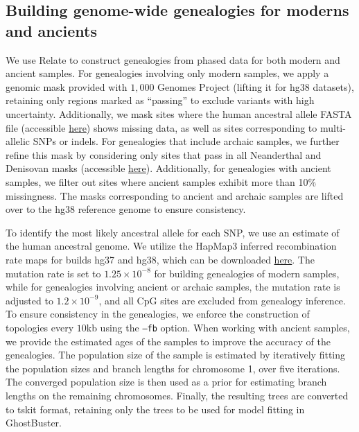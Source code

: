 \subsection{Building genome-wide genealogies for moderns and ancients}

We use Relate \cite{speidel2019method} to construct genealogies from phased data for both modern and ancient samples. For genealogies involving only modern samples, we apply a genomic mask provided with $1{,}000$ Genomes Project (lifting it for hg38 datasets), retaining only regions marked as ``passing'' to exclude variants with high uncertainty. Additionally, we mask sites where the human ancestral allele FASTA file (accessible \href{ftp://ftp.ensembl.org/pub/release-74/fasta/ancestral_alleles/homo_sapiens_ancestor_GRCh37_e71.tar.bz2}{here}) shows missing data, as well as sites corresponding to multi-allelic SNPs or indels. For genealogies that include archaic samples, we further refine this mask by considering only sites that pass in all Neanderthal and Denisovan masks (accessible \href{http://ftp.eva.mpg.de/neandertal/}{here}). Additionally, for genealogies with ancient samples, we filter out sites where ancient samples exhibit more than 10\% missingness. The masks corresponding to ancient and archaic samples are lifted over to the hg38 reference genome to ensure consistency.

To identify the most likely ancestral allele for each SNP, we use an estimate of the human ancestral genome. We utilize the HapMap3 inferred recombination rate maps for builds hg37 and hg38, which can be downloaded \href{https://github.com/odelaneau/shapeit5/tree/main/resources/maps/}{here}. The mutation rate is set to $1.25 \times 10^{-8}$ for building genealogies of modern samples, while for genealogies involving ancient or archaic samples, the mutation rate is adjusted to $1.2 \times 10^{-9}$, and all CpG sites are excluded from genealogy inference. To ensure consistency in the genealogies, we enforce the construction of topologies every $10$kb using the \texttt{--fb} option. When working with ancient samples, we provide the estimated ages of the samples to improve the accuracy of the genealogies. The population size of the sample is estimated by iteratively fitting the population sizes and branch lengths for chromosome 1, over five iterations. The converged population size is then used as a prior for estimating branch lengths on the remaining chromosomes. Finally, the resulting trees are converted to tskit format, retaining only the trees to be used for model fitting in GhostBuster.

